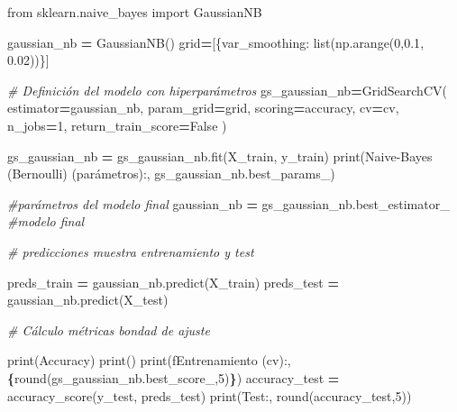 \documentclass[
  a4paper,
  DIV=11,
  numbers=noendperiod]{scrreprt}
\newenvironment{Shaded}{\begin{snugshade}}{\end{snugshade}}
\newcommand{\BuiltInTok}[1]{#1}
\newcommand{\CommentTok}[1]{\textcolor[rgb]{0.56,0.35,0.01}{\textit{#1}}}
\newcommand{\DecValTok}[1]{\textcolor[rgb]{0.00,0.00,0.81}{#1}}
\newcommand{\FloatTok}[1]{\textcolor[rgb]{0.00,0.00,0.81}{#1}}
\newcommand{\ImportTok}[1]{#1}
\newcommand{\NormalTok}[1]{#1}
\newcommand{\OperatorTok}[1]{\textcolor[rgb]{0.81,0.36,0.00}{\textbf{#1}}}
\newcommand{\SpecialCharTok}[1]{\textcolor[rgb]{0.81,0.36,0.00}{\textbf{#1}}}
\newcommand{\SpecialStringTok}[1]{\textcolor[rgb]{0.31,0.60,0.02}{#1}}
\newcommand{\StringTok}[1]{\textcolor[rgb]{0.31,0.60,0.02}{#1}}
\newcommand{\VariableTok}[1]{\textcolor[rgb]{0.00,0.00,0.00}{#1}}
\begin{document}
\begin{Shaded}
\begin{Highlighting}[numbers=left,,]
\ImportTok{from}\NormalTok{ sklearn.naive\_bayes }\ImportTok{import}\NormalTok{ GaussianNB  }

\NormalTok{gaussian\_nb }\OperatorTok{=}\NormalTok{ GaussianNB()}
\NormalTok{grid}\OperatorTok{=}\NormalTok{[\{}\StringTok{\textquotesingle{}var\_smoothing\textquotesingle{}}\NormalTok{: }\BuiltInTok{list}\NormalTok{(np.arange(}\DecValTok{0}\NormalTok{,}\FloatTok{0.1}\NormalTok{, }\FloatTok{0.02}\NormalTok{))\}]}

\CommentTok{\# Definición del modelo con hiperparámetros}
\NormalTok{gs\_gaussian\_nb}\OperatorTok{=}\NormalTok{GridSearchCV(}
\NormalTok{    estimator}\OperatorTok{=}\NormalTok{gaussian\_nb, param\_grid}\OperatorTok{=}\NormalTok{grid, scoring}\OperatorTok{=}\StringTok{\textquotesingle{}accuracy\textquotesingle{}}\NormalTok{, cv}\OperatorTok{=}\NormalTok{cv, n\_jobs}\OperatorTok{=}\DecValTok{1}\NormalTok{, return\_train\_score}\OperatorTok{=}\VariableTok{False}
\NormalTok{)}

\NormalTok{gs\_gaussian\_nb }\OperatorTok{=}\NormalTok{ gs\_gaussian\_nb.fit(X\_train, y\_train)}
\BuiltInTok{print}\NormalTok{(}\StringTok{\textquotesingle{}Naive{-}Bayes (Bernoulli) (parámetros):\textquotesingle{}}\NormalTok{, gs\_gaussian\_nb.best\_params\_) }

\CommentTok{\#parámetros del modelo final}
\NormalTok{gaussian\_nb }\OperatorTok{=}\NormalTok{ gs\_gaussian\_nb.best\_estimator\_ }\CommentTok{\#modelo final}

\CommentTok{\# predicciones muestra entrenamiento y test}

\NormalTok{preds\_train }\OperatorTok{=}\NormalTok{ gaussian\_nb.predict(X\_train)}
\NormalTok{preds\_test }\OperatorTok{=}\NormalTok{ gaussian\_nb.predict(X\_test)}

\CommentTok{\# Cálculo métricas bondad de ajuste }

\BuiltInTok{print}\NormalTok{(}\StringTok{\textquotesingle{}Accuracy\textquotesingle{}}\NormalTok{)}
\BuiltInTok{print}\NormalTok{(}\StringTok{\textquotesingle{}{-}{-}{-}{-}{-}{-}{-}{-}{-}{-}{-}{-}{-}{-}{-}{-}{-}{-}{-}{-}{-}{-}{-}{-}{-}{-}{-}{-}{-}{-}\textquotesingle{}}\NormalTok{)}
\BuiltInTok{print}\NormalTok{(}\SpecialStringTok{f\textquotesingle{}Entrenamiento (cv):, }\SpecialCharTok{\{}\BuiltInTok{round}\NormalTok{(gs\_gaussian\_nb.best\_score\_,}\DecValTok{5}\NormalTok{)}\SpecialCharTok{\}}\SpecialStringTok{\textquotesingle{}}\NormalTok{)}
\NormalTok{accuracy\_test }\OperatorTok{=}\NormalTok{ accuracy\_score(y\_test, preds\_test)}
\BuiltInTok{print}\NormalTok{(}\StringTok{\textquotesingle{}Test:\textquotesingle{}}\NormalTok{, }\BuiltInTok{round}\NormalTok{(accuracy\_test,}\DecValTok{5}\NormalTok{))}


\end{Highlighting}
\end{Shaded}
\end{document}
